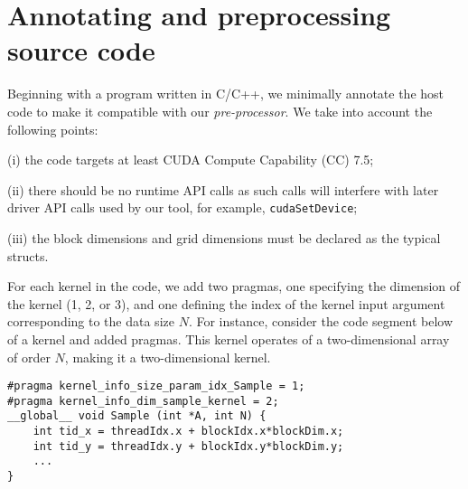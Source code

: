 \section{Annotating and preprocessing source code}
\label{sec:annotation}
	Beginning with a {\cuda} program written in C/C++, we minimally annotate the host code
	to make it compatible with our \textit{pre-processor}.
	We take into account the following points:
	\begin{enumerateshort}
	\item[(i)] 
	the code targets at least CUDA Compute Capability (CC) 7.5;
	\item[(ii)]
	there should be no {\cuda} runtime API calls as such calls will interfere
	with later {\cuda} driver API calls used by our tool, for example, \texttt{cudaSetDevice};
	\item[(iii)]
	the block dimensions and grid dimensions must be declared 
	as the typical {\cuda} {\dimThree} structs.
\end{enumerateshort}

For each kernel in the {\cuda} code, we add two 
pragmas, one specifying the dimension 
of the kernel (1, 2, or 3), and one defining the index of the kernel input argument 
corresponding to the data size $N$.
For instance, consider the code segment below of a {\cuda} kernel
and added pragmas.
This kernel operates of a two-dimensional array of order $N$, 
making it a two-dimensional kernel.	
{
\begin{tcolorbox}
\scriptsize
\begin{verbatim}
#pragma kernel_info_size_param_idx_Sample = 1; 
#pragma kernel_info_dim_sample_kernel = 2;
__global__ void Sample (int *A, int N) { 
    int tid_x = threadIdx.x + blockIdx.x*blockDim.x;
    int tid_y = threadIdx.y + blockIdx.y*blockDim.y;
    ...
}
\end{verbatim}
\end{tcolorbox}
}


